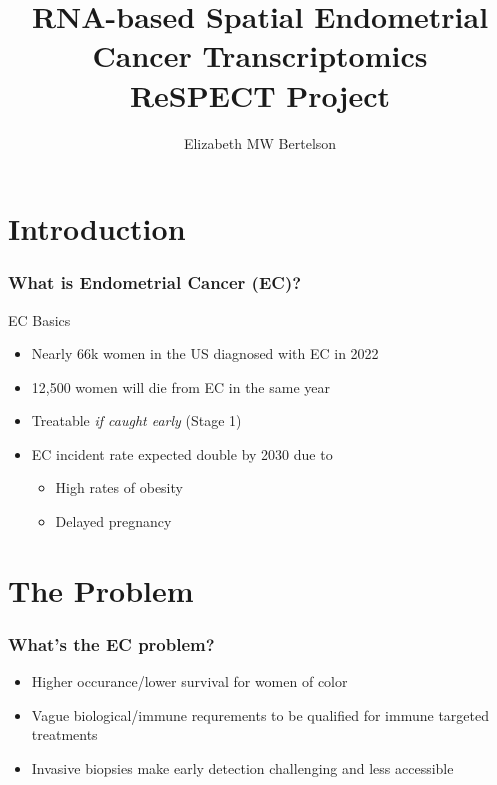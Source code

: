 \documentclass[pdflatex]{beamer}
\title[RNA-based Spatial Endometrial Cancer Transcriptomics]{RNA-based Spatial Endometrial Cancer Transcriptomics \\ ReSPECT Project}
\author[Bertelson]{Elizabeth MW Bertelson}
\institute[JHU]{Johns Hopkins University}
\begin{document}


\begin{frame}[plain]
  \titlepage
\end{frame}


\section{Introduction}

\begin{frame}
\frametitle{What is Endometrial Cancer (EC)?}


\pause EC Basics \pause
\begin{itemize}
\item Nearly 66k women in the US diagnosed with EC in 2022
\item 12,500 women will die from EC in the same year \\ \pause
\item Treatable {\it if caught early} (Stage 1)
\item EC incident rate expected double by 2030 due to
\begin{itemize}
\item High rates of obesity
\item Delayed pregnancy
\end{itemize}
\end{itemize}

\end{frame}

\medskip\medskip

\section{The Problem}


\begin{frame}
\frametitle{What's the EC problem?}
  
\pause
\begin{itemize}
\item Higher occurance/lower survival for women of color
\item Vague biological/immune requrements to be qualified for immune targeted treatments
\item Invasive biopsies make early detection challenging and less accessible
\end{itemize}

\end{frame}
\end{document}
